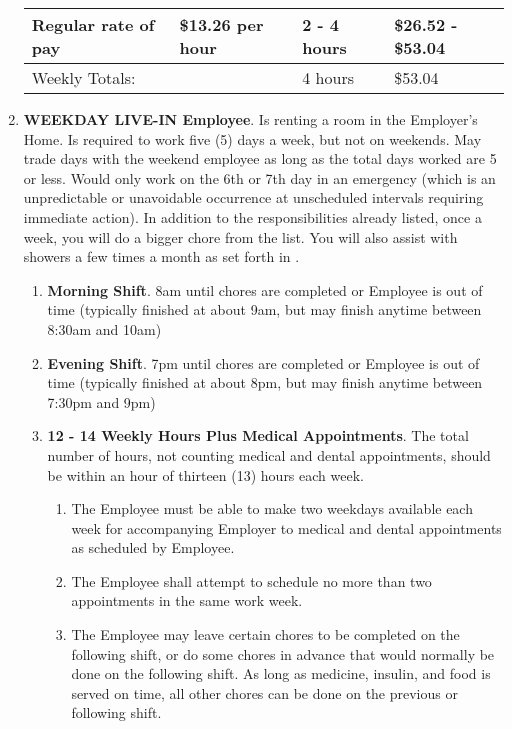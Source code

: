 \documentclass[]{article}
\newcommand{\sw}{.15\textwidth}
\newcommand{\bw}{.39\textwidth}
\newcommand{\weekday}{WEEKDAY LIVE-IN Employee}
\begin{document}
\begin{enumerate}
\begin{tabular}{|p{\bw}|p{\sw}|p{\sw}|p{\sw}|}
			Regular rate of pay & \$13.26 per hour & 2 - 4 hours & \$26.52 - \$53.04\\ \hline
			Weekly Totals: & &  4 hours & \$53.04\\
			\hline
		\end{tabular}
	\item \textbf{\weekday{}}. \label{weekday}
		Is renting a room in the Employer's Home. Is required to work five (5) days a week, but not on weekends. May trade days with the weekend employee as long as the total days worked are 5 or less. Would only work on the 6th or 7th day in an emergency (which is an unpredictable or unavoidable occurrence at unscheduled intervals requiring immediate action). In addition to the responsibilities already listed, once a week, you will do a bigger chore from the \bigchores{} list. You will also assist with showers a few times a month as set forth in \shower{}. 
		\begin{enumerate}
			\item \textbf{Morning Shift}. 8am until chores are completed or Employee is out of time (typically finished at about 9am, but may finish anytime between 8:30am and 10am)
			\item \textbf{Evening Shift}. 7pm until chores are completed or Employee is out of time (typically finished at about 8pm, but may finish anytime between 7:30pm and 9pm)
			\item \textbf{12 - 14 Weekly Hours Plus Medical Appointments}. The total number of hours, not counting medical and dental appointments, should be within an hour of thirteen (13) hours each week. 
				\begin{enumerate}
					\item The Employee must be able to make two weekdays available each week for accompanying Employer to medical and dental appointments as scheduled by Employee.
					\item The Employee shall attempt to schedule no more than two appointments in the same work week.
					\item The Employee may leave certain chores to be completed on the following shift, or do some chores in advance that would normally be done on the following shift. As long as medicine, insulin, and food is served on time, all other chores can be done on the previous or following shift.
				\end{enumerate}
		\end{enumerate}
		\begin{tabular}{|p{\bw}|p{\sw}|p{\sw}|p{\sw}|}
			\hline

\end{tabular}
\end{enumerate}
\end{document}
